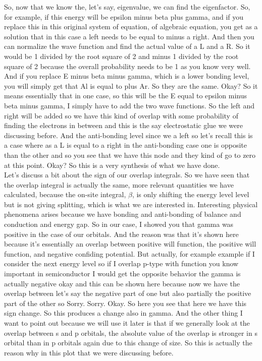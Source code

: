 So, now that we know the, let's say, eigenvalue, we can find the eigenfactor. So, for example, if this energy will be epsilon minus beta plus gamma, and if you replace this in this original system of equation, of algebraic equation, you get as a solution that in this case a left needs to be equal to minus a right. And then you can normalize the wave function and find the actual value of a L and a R. So it would be 1 divided by the root square of 2 and minus 1 divided by the root square of 2 because the overall probability needs to be 1 as you know very well. And if you replace E minus beta minus gamma, which is a lower bonding level, you will simply get that Al is equal to plus Ar. So they are the same. Okay? So it means essentially that in one case, so this will be the E equal to epsilon minus beta minus gamma, I simply have to add the two wave functions. So the left and right will be added so we have this kind of overlap with some probability of finding the electrons in between and this is the say electrostatic glue we were discussing before.
And the anti-bonding level since we a left so let's recall this is a case where as a L is equal to a right in the anti-bonding case one is opposite than the other and so you see that we have this node and they kind of go to zero at this point. Okay? So this is a very synthesis of what we have done.\\
Let's discuss a bit about the sign of our overlap integrals. So we have seen that the overlap integral is actually the same, more relevant quantities we have calculated, because the on-site integral, $\beta$, is only shifting the energy level level but is not giving splitting, which is what we are interested in. Interesting physical phenomena arises because we have bonding and anti-bonding of balance and conduction and energy gap. So in our case, I showed you that gamma was positive in the case of our orbitals. And the reason was that it's shown here because it's essentially an overlap between positive will function, the positive will function, and negative confiding potential. But actually, for example example if I consider the next energy level so if I overlap p-type with function you know important in semiconductor I would get the opposite behavior the gamma is actually negative okay and this can be shown here because now we have the overlap between let's say the negative part of one but also partially the positive part of the other so Sorry. Sorry. Okay. So here you see that here we have this sign change. So this produces a change also in gamma. And the other thing I want to point out because we will use it later is that if we generally look at the overlap between s and p orbitals, the absolute value of the overlap is stronger in s orbital than in p orbitals again due to this change of size. So this is actually the reason why in this plot that we were discussing before.
